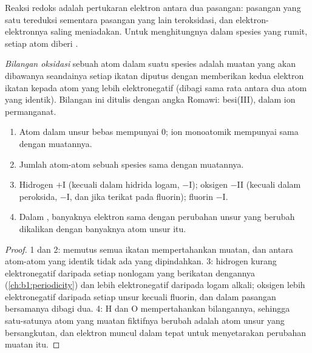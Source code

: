 Reaksi redoks adalah pertukaran elektron antara dua pasangan: 
pasangan yang satu tereduksi sementara  pasangan yang lain
teroksidasi, dan elektron-elektronnya saling meniadakan. Untuk
menghitungnya dalam spesies yang rumit, setiap atom diberi .

\begin{definition}\label{def:b1:nernst:oxidation-number}
\emph{Bilangan oksidasi} sebuah atom dalam suatu
spesies adalah muatan yang akan dibawanya seandainya setiap ikatan
diputus dengan memberikan kedua elektron ikatan kepada atom yang lebih
elektronegatif (dibagi sama rata antara dua atom yang identik). Bilangan
ini ditulis dengan angka Romawi: besi(III),  dalam ion
permanganat.
\end{definition}

\begin{proposition}\label{prop:b1:nernst:on-rules}
\begin{enumerate}
  \item Atom dalam unsur bebas mempunyai  0; ion
        monoatomik mempunyai  sama dengan muatannya.
  \item Jumlah  atom-atom sebuah spesies sama dengan
        muatannya.
  \item Hidrogen $+$I (kecuali dalam hidrida logam, $-$I); oksigen
        $-$II (kecuali dalam peroksida, $-$I, dan jika terikat pada
        fluorin); fluorin $-$I.
  \item Dalam , banyaknya elektron sama dengan perubahan
         unsur yang berubah dikalikan dengan banyaknya
        atom unsur itu.
\end{enumerate}
\end{proposition}

\begin{proof}
1 dan 2: memutus semua ikatan mempertahankan muatan, dan antara atom-atom
yang identik tidak ada yang dipindahkan. 3: hidrogen kurang elektronegatif
daripada setiap nonlogam yang berikatan dengannya (\cref{ch:b1:periodicity})
dan lebih elektronegatif daripada logam alkali; oksigen lebih
elektronegatif daripada setiap unsur kecuali fluorin, dan dalam 
pasangan bersamanya dibagi dua. 4: H dan O mempertahankan bilangannya,
sehingga satu-satunya atom yang muatan fiktifnya berubah adalah atom
unsur yang bersangkutan, dan elektron muncul dalam  tepat
untuk menyetarakan perubahan muatan itu.
\end{proof}

